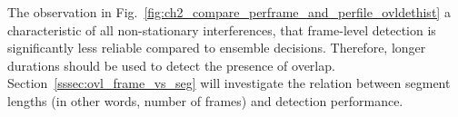 {The observation in Fig.~\ref{fig:ch2_compare_perframe_and_perfile_ovldethist} a characteristic of all non-stationary interferences, that frame-level detection is significantly less reliable compared to ensemble decisions. 
Therefore, longer durations should be used to detect the presence of overlap. 
Section~\ref{sssec:ovl_frame_vs_seg} will investigate the relation between segment lengths (in other words, number of frames) and detection performance. 


}
